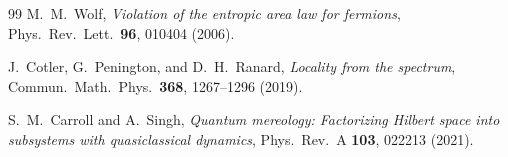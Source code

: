 \documentclass[12pt,a4paper]{article}
\begin{document}
\begin{thebibliography}{99}
M.~M.~Wolf,
\emph{Violation of the entropic area law for fermions},
Phys.\ Rev.\ Lett.\ \textbf{96}, 010404 (2006).

J.~Cotler, G.~Penington, and D.~H.~Ranard,
\emph{Locality from the spectrum},
Commun.\ Math.\ Phys.\ \textbf{368}, 1267--1296 (2019).

S.~M.~Carroll and A.~Singh,
\emph{Quantum mereology: Factorizing Hilbert space into subsystems with quasiclassical dynamics},
Phys.\ Rev.\ A \textbf{103}, 022213 (2021).

\end{thebibliography}
\end{document}

